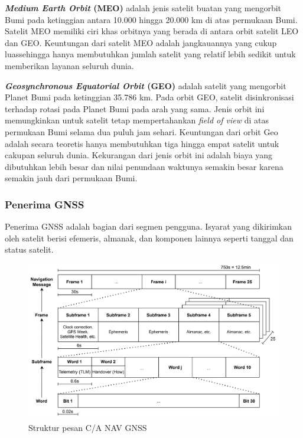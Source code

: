 \textbf{\textit{Medium Earth Orbit} (MEO)} adalah jenis satelit buatan yang mengorbit Bumi pada ketinggian antara 10.000 hingga 20.000 km di atas permukaan Bumi. Satelit MEO memiliki ciri khas orbitnya yang berada di antara orbit satelit LEO dan GEO. Keuntungan dari satelit MEO adalah jangkauannya yang cukup luassehingga hanya membutuhkan jumlah satelit yang relatif lebih sedikit untuk memberikan layanan seluruh dunia.

\textbf{\textit{Geosynchronous Equatorial Orbit} (GEO)} adalah satelit yang mengorbit Planet Bumi pada ketinggian 35.786 km. Pada orbit GEO, satelit disinkronisasi terhadap rotasi pada Planet Bumi pada arah yang sama. Jenis orbit ini memungkinkan untuk satelit tetap mempertahankan \textit{field of view} di atas permukaan Bumi selama dua puluh jam sehari. Keuntungan dari orbit Geo adalah secara teoretis hanya membutuhkan tiga hingga empat satelit untuk cakupan seluruh dunia. Kekurangan dari jenis orbit ini adalah biaya yang dibutuhkan lebih besar dan nilai penundaan waktunya semakin besar karena semakin jauh dari permukaan Bumi.

\subsubsection{Penerima GNSS}
Penerima GNSS adalah bagian dari segmen pengguna. Isyarat yang dikirimkan oleh satelit berisi efemeris, almanak, dan komponen lainnya seperti tanggal dan status satelit.

\begin{figure}[H]
	\centering
	\includegraphics[width=13cm]{contents/chapter-2/gnss_msg_structure.png}
	\caption{Struktur pesan C/A NAV GNSS}
	\label{Fig: gnss_message_structure}
\end{figure}


